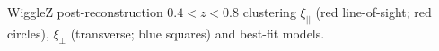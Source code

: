 \label{fig:wigglez_wedges_z48} WiggleZ post-reconstruction $0.4<z<0.8$ clustering $\xi_{||}$ (red line-of-sight; red circles), $\xi_{\perp}$ (transverse; blue squares) and best-fit models.